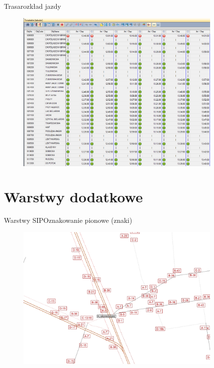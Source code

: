 \documentclass[8pt]{beamer}
\begin{document}
\begin{frame}{Trasa}{rozkład jazdy}
\begin{figure}\begin{center}
\includegraphics[width=0.9\textwidth]{timetable1}
 \end{center}  \end{figure} 
\end{frame}


\section{Warstwy dodatkowe}
\begin{frame}{Warstwy SIP}{Oznakowanie pionowe (znaki)}
\begin{figure}\begin{center}
\includegraphics[width=0.9\textwidth]{POI1}
 \end{center}  \end{figure} 
\end{frame}
\end{document}
